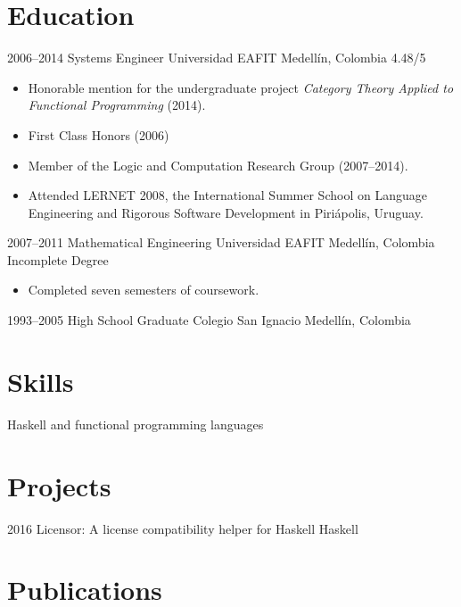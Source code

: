 \documentclass[12pt,letterpaper,sans]{moderncv}
\begin{document}
\section{Education}

\cventry
  {2006--2014}
  {Systems Engineer}
  {Universidad EAFIT}
  {Medellín, Colombia}
  {4.48/5}
  {
    \begin{itemize}
      \item
        Honorable mention for the undergraduate project \emph{Category
        Theory Applied to Functional Programming} (2014).
      \item
        First Class Honors (2006)
      \item
        Member of the Logic and Computation Research Group
        (2007--2014).
      \item
        Attended LERNET 2008, the International Summer School on
        Language Engineering and Rigorous Software Development in
        Piriápolis, Uruguay.
    \end{itemize}
  }
\cventry
  {2007--2011}
  {Mathematical Engineering}
  {Universidad EAFIT}
  {Medellín, Colombia}
  {Incomplete Degree}
  {
    \begin{itemize}
    \item
      Completed seven semesters of coursework.
    \end{itemize}
  }
\cventry
  {1993--2005}
  {High School Graduate}
  {Colegio San Ignacio}
  {Medellín, Colombia}
  {}
  {}

\section{Skills}

  {Haskell and functional programming languages}

\section{Projects}

\cventry
  {2016}
  {}
  {Licensor: A license compatibility helper for Haskell}
  {Haskell}
  {}
  {}

\section{Publications}
\end{document}
